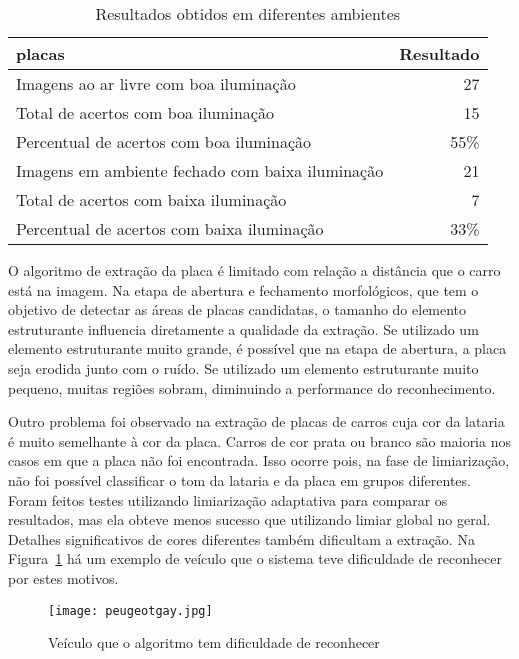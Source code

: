 \begin{table}[]
\centering
\caption{Resultados obtidos em diferentes ambientes}
\label{tab:resultados_ambientes}
\begin{tabular}{@{}lr@{}}
\toprule
placas                                      		& \multicolumn{1}{l}{Resultado} \\ \midrule
Imagens ao ar livre com boa iluminação     			& 27                            \\
Total de acertos com boa iluminação    			 	& 15                            \\
Percentual de acertos com boa iluminação    		 & 55\%                            \\
Imagens em ambiente fechado com baixa iluminação     & 21                            \\
Total de acertos com baixa iluminação    			 & 7                            \\
Percentual de acertos com baixa iluminação 			& 33\%
\end{tabular}
\end{table}

O algoritmo de extração da placa é limitado com relação a distância que o carro
está na imagem. Na etapa de abertura e fechamento morfológicos, que tem o
objetivo de detectar as áreas de placas candidatas, o tamanho do elemento
estruturante influencia diretamente a qualidade da extração. Se utilizado um
elemento estruturante muito grande, é possível que na etapa de abertura, a placa
seja erodida junto com o ruído. Se utilizado um elemento estruturante muito
pequeno, muitas regiões sobram, diminuindo a performance do reconhecimento.

Outro problema foi observado na extração de placas de carros cuja cor da lataria
é muito semelhante à cor da placa. Carros de cor prata ou branco são maioria nos casos
em que a placa não foi encontrada. Isso ocorre pois, na fase de limiarização, não foi 
possível classificar o tom da lataria e da placa em grupos diferentes. Foram feitos testes
utilizando limiarização adaptativa para comparar os resultados, mas ela obteve menos sucesso
que utilizando limiar global no geral. Detalhes significativos de cores diferentes também dificultam
a extração. Na Figura~\ref{fig:peugeot_gay} há um exemplo de veículo que o sistema teve dificuldade
de reconhecer por estes motivos.

\begin{figure}[H]
	\centering
	\texttt{[image: peugeotgay.jpg]}
	\caption{Veículo que o algoritmo tem dificuldade de reconhecer}
	\label{fig:peugeot_gay}
\end{figure}

